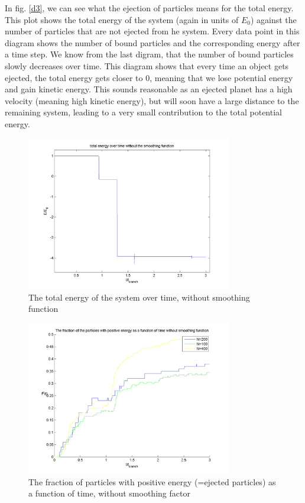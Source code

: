\documentclass[10pt,a4paper]{article}
\begin{document}
In fig. \ref{d3}, we can see what the ejection of particles means for the total energy. This plot shows the total energy of the system (again in units of $E_0$) against the number of particles that are not ejected from he system. Every data point in this diagram shows the number of bound particles and the corresponding energy after a time step. We know from the last digram, that the number of bound particles slowly decreases over time. This diagram shows that every time an object gets ejected, the total energy gets closer to $0$, meaning that we lose potential energy and gain kinetic energy. This sounds reasonable as an ejected planet has a high velocity (meaning high kinetic energy), but will soon have a large distance to the remaining system, leading to a very small contribution to the total potential energy.
\begin{figure}[h]
	\caption{The total energy of the system over time, without smoothing 		function\label{c1}}
	\includegraphics[width=0.8\textwidth]{c1.png}
\end{figure}
\begin{figure}[h]
	\caption{The fraction of particles with positive energy (=ejected particles) as a function of time, without smoothing factor\label{d2}}
	\includegraphics[width=0.8\textwidth]{d2.png}
\end{figure}
\end{document}
